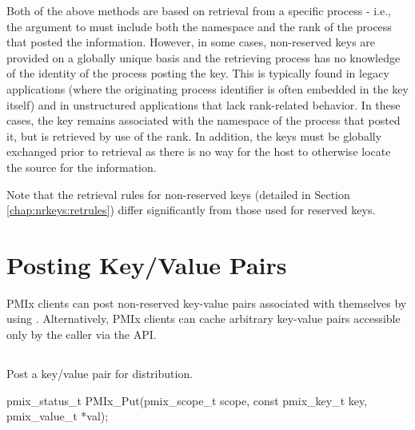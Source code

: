 Both of the above methods are based on retrieval from a specific process -
i.e., the  argument to  must include both the
namespace and the rank of the process that posted the information. However, in
some cases, non-reserved keys are provided on a globally unique basis and the
retrieving process has no knowledge of the identity of the process posting the
key. This is typically found in legacy applications (where the originating
process identifier is often embedded in the key itself) and in unstructured
applications that lack rank-related behavior. In these cases, the key remains
associated with the namespace of the process that posted it, but is retrieved
by use of the  rank. In addition, the keys must be
globally exchanged prior to retrieval as there is no way for the host to
otherwise locate the source for the information.

Note that the retrieval rules for non-reserved keys (detailed in Section \ref{chap:nrkeys:retrules}) differ significantly from those used for reserved keys.


\section{Posting Key/Value Pairs}
\label{chap:api_kv_mgmt:set}

\ac{PMIx} clients can post non-reserved key-value pairs associated with themselves by using . Alternatively, \ac{PMIx} clients can cache arbitrary key-value pairs accessible only by the caller via the  \ac{API}.


\subsection{}

\summary

Post a key/value pair for distribution.

\format

\cspecificstart
\begin{codepar}
pmix_status_t
PMIx_Put(pmix_scope_t scope,
         const pmix_key_t key,
         pmix_value_t *val);
\end{codepar}
\cspecificend

\begin{arglist}
\end{arglist}

